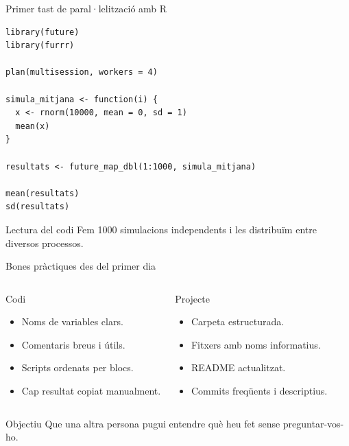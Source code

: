 \documentclass[10pt,aspectratio=169]{beamer}
\begin{document}
\begin{frame}[fragile]{Primer tast de paral·lelització amb R}
\begin{lstlisting}
library(future)
library(furrr)

plan(multisession, workers = 4)

simula_mitjana <- function(i) {
  x <- rnorm(10000, mean = 0, sd = 1)
  mean(x)
}

resultats <- future_map_dbl(1:1000, simula_mitjana)

mean(resultats)
sd(resultats)
\end{lstlisting}

\begin{block}{Lectura del codi}
Fem 1000 simulacions independents i les distribuïm entre diversos processos.
\end{block}
\end{frame}

\begin{frame}{Bones pràctiques des del primer dia}
\begin{columns}[T]
\begin{block}{Codi}
\begin{itemize}
  \item Noms de variables clars.
  \item Comentaris breus i útils.
  \item Scripts ordenats per blocs.
  \item Cap resultat copiat manualment.
\end{itemize}
\end{block}

\begin{block}{Projecte}
\begin{itemize}
  \item Carpeta estructurada.
  \item Fitxers amb noms informatius.
  \item README actualitzat.
  \item Commits freqüents i descriptius.
\end{itemize}
\end{block}
\end{columns}

\vspace{0.25cm}
\begin{alertblock}{Objectiu}
Que una altra persona pugui entendre què heu fet sense preguntar-vos-ho.
\end{alertblock}
\end{frame}
\end{document}
